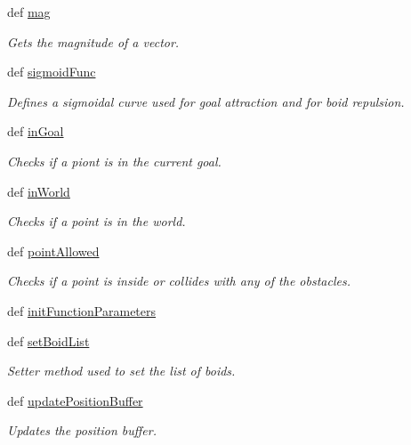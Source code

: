 \begin{DoxyCompactItemize}
def \hyperlink{classboid_1_1Boid_a5324650d399f5c850ec7b7bda10eeae7}{mag}
\begin{DoxyCompactList}\small\item\em Gets the magnitude of a vector. \end{DoxyCompactList}\item 
def \hyperlink{classboid_1_1Boid_a492a0ad33a962b15ed94789d59f3b08a}{sigmoid\-Func}
\begin{DoxyCompactList}\small\item\em Defines a sigmoidal curve used for goal attraction and for boid repulsion. \end{DoxyCompactList}\item 
def \hyperlink{classboid_1_1Boid_a19392045cdd5e9b46136369028be3c52}{in\-Goal}
\begin{DoxyCompactList}\small\item\em Checks if a piont is in the current goal. \end{DoxyCompactList}\item 
def \hyperlink{classboid_1_1Boid_a321e7b1d2c37c96503e11e00ee87b96f}{in\-World}
\begin{DoxyCompactList}\small\item\em Checks if a point is in the world. \end{DoxyCompactList}\item 
def \hyperlink{classboid_1_1Boid_ae4afdcafb2e1c89390dc0648dae4c6fe}{point\-Allowed}
\begin{DoxyCompactList}\small\item\em Checks if a point is inside or collides with any of the obstacles. \end{DoxyCompactList}\item 
def \hyperlink{classboid_1_1Boid_a0df699bd295042ed4b088d94bc158f17}{init\-Function\-Parameters}
\item 
def \hyperlink{classboid_1_1Boid_ad7296706ec7c12098d3beda40c3fb283}{set\-Boid\-List}
\begin{DoxyCompactList}\small\item\em Setter method used to set the list of boids. \end{DoxyCompactList}\item 
def \hyperlink{classboid_1_1Boid_a0eb922b53c2f4e30dc0d042d1649fd2c}{update\-Position\-Buffer}
\begin{DoxyCompactList}\small\item\em Updates the position buffer. \end{DoxyCompactList}\item 

\end{DoxyCompactItemize}
